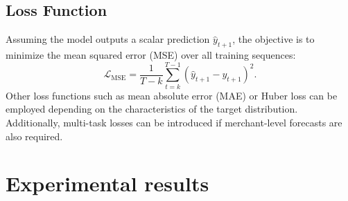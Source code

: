 \documentclass{article}
\begin{document}




\subsection{Loss Function}

Assuming the model outputs a scalar prediction \( \hat{y}_{t+1} \), the objective is to minimize the mean squared error (MSE) over all training sequences:
\[
\mathcal{L}_{\text{MSE}} = \frac{1}{T-k} \sum_{t=k}^{T-1} \left( \hat{y}_{t+1} - y_{t+1} \right)^2.
\]
Other loss functions such as mean absolute error (MAE) or Huber loss can be employed depending on the characteristics of the target distribution. Additionally, multi-task losses can be introduced if merchant-level forecasts are also required.


\section{Experimental results}
\label{s:results}
\end{document}

